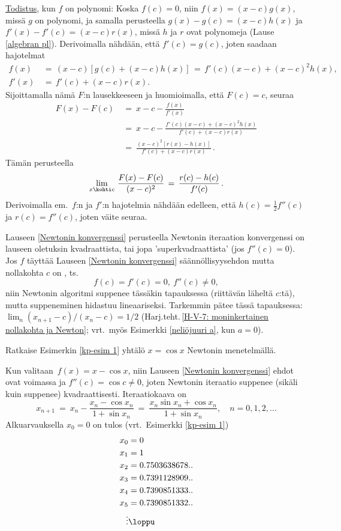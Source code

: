 \underline{Todistus}, kun $f$ on polynomi: Koska $f(c)=0$, niin $f(x)=(x-c)g(x)$, missä
$g$ on polynomi, ja samalla perusteella $g(x)-g(c)=(x-c)h(x)$ ja $f'(x)-f'(c)=(x-c)r(x)$,
missä $h$ ja $r$ ovat polynomeja (Lause \ref{algebran pl}). Derivoimalla nähdään, että
$f'(c)=g(c)$, joten saadaan hajotelmat
\begin{align*}
f(x)  \,&=\, (x-c)[g(c)+(x-c)h(x)] \,=\, f'(c)(x-c)+(x-c)^2h(x), \\
f'(x) \,&=\, f'(c)+(x-c)r(x).
\end{align*}
Sijoittamalla nämä $F$:n lausekkeeseen ja huomioimalla, että $F(c)=c$, seuraa
\begin{align*}
F(x)-F(c)\ &=\ x-c - \frac{f(x)}{f'(x)} \\
           &=\ x-c - \frac{f'(c)(x-c)+(x-c)^2h(x)}{f'(c)+(x-c)r(x)} \\
           &=\ \frac{(x-c)^2[r(x)-h(x)]}{f'(c)+(x-c)r(x)}\,.
\end{align*}
Tämän perusteella
\[
\lim_{x \kohti c}\,\frac{F(x)-F(c)}{(x-c)^2} \,=\, \frac{r(c)-h(c)}{f'(c)}\,.
\]
Derivoimalla em.\ $f$:n ja $f'$:n hajotelmia nähdään edelleen, että $h(c)=\tfrac{1}{2}f''(c)$
ja $r(c)=f''(c)$, joten väite seuraa. \loppu

Lauseen \ref{Newtonin konvergenssi} perusteella Newtonin iteraation konvergenssi on lauseen
oletuksin kvadraattista, tai jopa 'superkvadraattista' (jos $f''(c)=0$). Jos $f$ täyttää
Lauseen \ref{Newtonin konvergenssi} säännöllisyysehdon mutta nollakohta $c$ on
%
, ts.\
\[
f(c)=f'(c)=0, \ f''(c)\neq 0,
\]
niin Newtonin algoritmi suppenee tässäkin tapauksessa (riittävän läheltä $c$:tä), mutta
suppeneminen hidastuu lineaariseksi. Tarkemmin pätee tässä tapauksessa:
$\lim_n (x_{n+1}-c)/(x_n-c) = 1/2$ 
(Harj.teht.\,\ref{H-V-7: moninkertainen nollakohta ja Newton}; vrt.\ myös Esimerkki
\ref{neliöjuuri a}, kun $a=0$). 
\begin{Exa} Ratkaise Esimerkin \ref{kp-esim 1} yhtälö $x=\cos x$ Newtonin menetelmällä.
\end{Exa}
\ratk Kun valitaan $\,f(x)=x-\cos x$, niin Lauseen \ref{Newtonin konvergenssi} ehdot ovat
voimassa ja $f''(c)=\cos c \neq 0$, joten Newtonin iteraatio suppenee (sikäli kuin suppenee)
kvadraattisesti. Iteraatiokaava on
\[
x_{n+1}\ =\ x_n - \frac{x_n-\cos x_n}{1+\sin x_n}\
         =\ \frac{x_n\sin x_n+\cos x_n}{1+\sin x_n},\quad n=0,1,2,\ldots
\]
Alkuarvauksella $x_0=0$ on tulos (vrt.\ Esimerkki \ref{kp-esim 1})
\begin{align*}
x_0    &= 0 \\
x_1    &= 1 \\
x_2    &= 0.7503638678.. \\
x_3    &= 0.7391128909.. \\
x_4    &= 0.7390851333.. \\
x_5    &= 0.7390851332.. \\
\vdots & \loppu
\end{align*}

